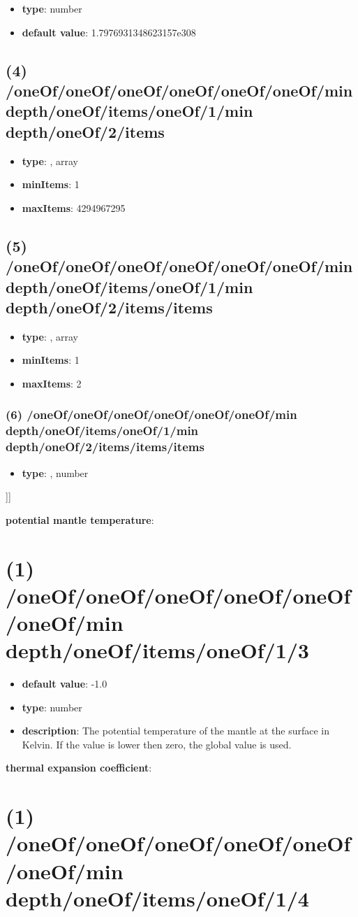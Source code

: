 \begin{itemize}[leftmargin=5em]\item {\bf type}: number\item {\bf default value}: 1.7976931348623157e308
\end{itemize}\subsection{(4) /oneOf/oneOf/oneOf/oneOf/oneOf/oneOf/min depth/oneOf/items/oneOf/1/min depth/oneOf/2/items}
\begin{itemize}[leftmargin=4em]\item {\bf type}: , array\item {\bf minItems}: 1
\item {\bf maxItems}: 4294967295
\end{itemize}\subsection{(5) /oneOf/oneOf/oneOf/oneOf/oneOf/oneOf/min depth/oneOf/items/oneOf/1/min depth/oneOf/2/items/items}
\begin{itemize}[leftmargin=5em]\item {\bf type}: , array\item {\bf minItems}: 1
\item {\bf maxItems}: 2
\end{itemize}\subsubsection{(6) /oneOf/oneOf/oneOf/oneOf/oneOf/oneOf/min depth/oneOf/items/oneOf/1/min depth/oneOf/2/items/items/items}
\begin{itemize}[leftmargin=6em]\item {\bf type}: , number\end{itemize}]]\item {\bf potential mantle temperature}: \section{(1) /oneOf/oneOf/oneOf/oneOf/oneOf/oneOf/min depth/oneOf/items/oneOf/1/3}
\begin{itemize}[leftmargin=1em]\item {\bf default value}: -1.0
\item {\bf type}: number
\item {\bf description}: The potential temperature of the mantle at the surface in Kelvin. If the value is lower then zero, the global value is used.
\end{itemize}\item {\bf thermal expansion coefficient}: \section{(1) /oneOf/oneOf/oneOf/oneOf/oneOf/oneOf/min depth/oneOf/items/oneOf/1/4}
